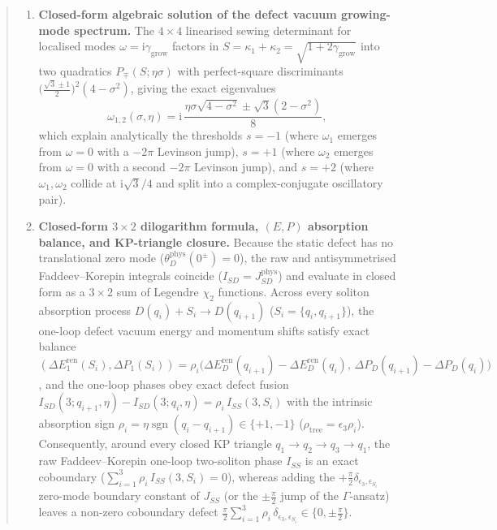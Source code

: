 \documentclass[11pt,a4paper]{article}
\newcommand{\ii}{\mathrm{i}}
\newcommand{\sgn}{\operatorname{sgn}}
\begin{document}
\begin{abstract}
\begin{enumerate}
$\theta_S'(q;\alpha,\epsilon)$.
\item \textbf{Closed-form algebraic solution of the defect vacuum growing-mode spectrum.}
The $4\times 4$ linearised sewing determinant for localised modes
$\omega = \ii\gamma_{\mathrm{grow}}$ factors in $S = \kappa_1+\kappa_2 = \sqrt{1+2\gamma_{\mathrm{grow}}}$
into two quadratics $P_\mp(S;\eta\sigma)$ with perfect-square discriminants
$\big(\frac{\sqrt{3}\pm 1}{2}\big)^2(4-\sigma^2)$, giving the exact eigenvalues
\[
  \omega_{1,2}(\sigma,\eta) = \ii\,\frac{\eta\sigma\sqrt{4-\sigma^2} \pm \sqrt{3}(2-\sigma^2)}{8},
\]
which explain analytically the thresholds $s=-1$ (where $\omega_1$ emerges from
$\omega=0$ with a $-2\pi$ Levinson jump), $s=+1$ (where $\omega_2$ emerges from
$\omega=0$ with a second $-2\pi$ Levinson jump), and $s=+2$ (where $\omega_1,\omega_2$
collide at $\ii\sqrt{3}/4$ and split into a complex-conjugate oscillatory pair).
\item \textbf{Closed-form $3\times 2$ dilogarithm formula, $(E,P)$ absorption balance, and KP-triangle closure.}
Because the static defect has no translational zero mode ($\theta_D^{\mathrm{phys}}(0^\pm)=0$),
the raw and antisymmetrised Faddeev--Korepin integrals coincide ($I_{SD} = J_{SD}^{\mathrm{phys}}$)
and evaluate in closed form as a $3\times 2$ sum of Legendre $\chi_2$ functions.
Across every soliton absorption process $D(q_i)+S_i \to D(q_{i+1})$ ($S_i=\{q_i,q_{i+1}\}$),
the one-loop defect vacuum energy and momentum shifts satisfy exact balance
$(\Delta E_1^{\mathrm{ren}}(S_i),\Delta P_1(S_i)) = \rho_i\big(\Delta E_D^{\mathrm{ren}}(q_{i+1})-\Delta E_D^{\mathrm{ren}}(q_i),\,\Delta P_D(q_{i+1})-\Delta P_D(q_i)\big)$,
and the one-loop phases obey exact defect fusion
$I_{SD}(3;q_{i+1},\eta)-I_{SD}(3;q_i,\eta) = \rho_i\,I_{SS}(3,S_i)$ with the
intrinsic absorption sign $\rho_i = \eta\sgn(q_i-q_{i+1}) \in \{+1,-1\}$
($\rho_{\mathrm{tree}} = \epsilon_3\rho_i$). Consequently, around every closed KP
triangle $q_1\to q_2\to q_3\to q_1$, the raw Faddeev--Korepin one-loop two-soliton
phase $I_{SS}$ is an exact coboundary ($\sum_{i=1}^3\rho_i\,I_{SS}(3,S_i)=0$),
whereas adding the $+\frac{\pi}{2}\delta_{\epsilon_3,\epsilon_{S_i}}$ zero-mode
boundary constant of $J_{SS}$ (or the $\pm\frac{\pi}{2}$ jump of the $\Gamma$-ansatz)
leaves a non-zero coboundary defect $\frac{\pi}{2}\sum_{i=1}^3\rho_i\,\delta_{\epsilon_3,\epsilon_{S_i}} \in \{0,\pm\frac{\pi}{2}\}$.
\end{enumerate}
\end{abstract}

\tableofcontents
\end{document}
